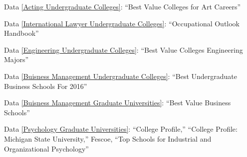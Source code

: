 \newpage 
{}
\begin{imagescited} 
\begin{flushleft}
\linespread{1.5}

Data \ref{Acting Undergraduate Colleges}:
\bibent
“Best Value Colleges for Art Careers”

Data \ref{International Lawyer Undergraduate Colleges}:
\bibent
“Occupational Outlook Handbook”

Data \ref{Engineering Undergraduate Colleges}:
\bibent
“Best Value Colleges Engineering Majors”

Data \ref{Buisness Management Undergraduate Colleges}:
\bibent
“Best Undergraduate Business Schools For 2016”

Data \ref{Buisness Management Graduate Universities}:
\bibent
“Best Value Business Schools”

Data \ref{Psychology Graduate Universities}:
\bibent
“College Profile,” “College Profile: Michigan State University,” Fescoe, “Top Schools for Industrial and Organizational Psychology”

\end{flushleft}
\end{imagescited} 